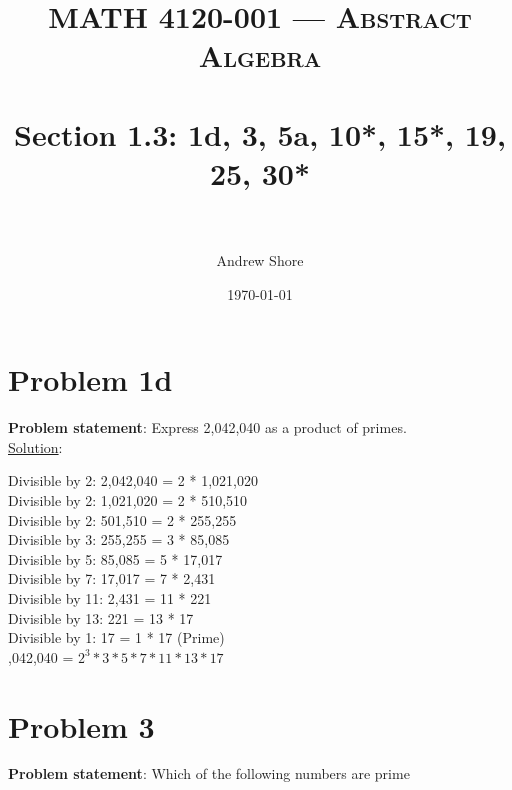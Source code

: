 \documentclass{article} %
\title{ 
\normalfont \normalsize 
\textsc{MATH 4120-001 --- Abstract Algebra} \\
\horrule{0.5pt} \\[0cm] %
\huge Section 1.3: 1d, 3, 5a, 10*, 15*, 19, 25, 30*  \\ %
\horrule{2pt} \\[0cm] %
}
\author{Andrew Shore} %
\date{\normalsize\today} %
\begin{document}
\maketitle %

\section*{Problem 1d}


\textbf{Problem statement}: Express 2,042,040 as a product of primes.
\\

\underline{Solution}: 
\begin{addmargin}[1em]{0em}
Divisible by 2: 2,042,040 = 2 * 1,021,020
\\Divisible by 2: 1,021,020 = 2 * 510,510
\\Divisible by 2: 501,510 = 2 * 255,255
\\Divisible by 3: 255,255 = 3 * 85,085
\\Divisible by 5: 85,085 = 5 * 17,017
\\Divisible by 7: 17,017 = 7 * 2,431
\\Divisible by 11: 2,431 = 11 * 221
\\Divisible by 13: 221 = 13 * 17
\\Divisible by 1: 17 = 1 * 17 (Prime)
\\ \hfill {},042,040 = $2^3*3*5*7*11*13*17$
\end{addmargin}    

\newpage

\section*{Problem 3}

\textbf{Problem statement}: Which of the following numbers are prime
\\
\end{document}

